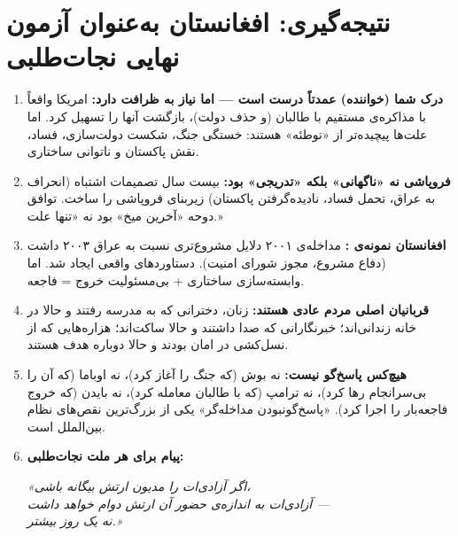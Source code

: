 \section*{نتیجه‌گیری: افغانستان به‌عنوان آزمون نهایی نجات‌طلبی}%

\label{sec:app-afg-conclusion}

\begin{tcolorbox}[wavebox, title={یافته‌های نهایی}]
\begin{enumerate}[nosep, label=\textbf{\arabic*.}]
  \item \textbf{درک شما (خواننده) عمدتاً درست است — اما نیاز به ظرافت دارد:} امریکا واقعاً با مذاکره‌ی مستقیم با طالبان (و حذف دولت)، بازگشت آنها را تسهیل کرد. اما علت‌ها پیچیده‌تر از «توطئه» هستند: خستگی جنگ، شکست دولت‌سازی، فساد، نقش پاکستان و ناتوانی ساختاری.

  \item \textbf{فروپاشی نه «ناگهانی» بلکه «تدریجی» بود:} بیست سال تصمیمات اشتباه (انحراف به عراق، تحمل فساد، نادیده‌گرفتن پاکستان) زیربنای فروپاشی را ساخت. توافق دوحه «آخرین میخ» بود نه «تنها علت.»

  \item \textbf{افغانستان نمونه‌ی :} مداخله‌ی ۲۰۰۱ دلایل مشروع‌تری نسبت به عراق ۲۰۰۳ داشت (دفاع مشروع، مجوز شورای امنیت). دستاوردهای واقعی ایجاد شد. اما وابسته‌سازی ساختاری + بی‌مسئولیت خروج = فاجعه.

  \item \textbf{قربانیان اصلی مردم عادی هستند:} زنان، دخترانی که به مدرسه رفتند و حالا در خانه زندانی‌اند؛ خبرنگارانی که صدا داشتند و حالا ساکت‌اند؛ هزاره‌هایی که از نسل‌کشی در امان بودند و حالا دوباره هدف هستند.

  \item \textbf{هیچ‌کس پاسخ‌گو نیست:} نه بوش (که جنگ را آغاز کرد)، نه اوباما (که آن را بی‌سرانجام رها کرد)، نه ترامپ (که با طالبان معامله کرد)، نه بایدن (که خروج فاجعه‌بار را اجرا کرد). «پاسخ‌گونبودن مداخله‌گر» یکی از بزرگ‌ترین نقص‌های نظام بین‌الملل است.

  \item \textbf{پیام برای هر ملت نجات‌طلبی:}
  \begin{center}
  \textit{«اگر آزادی‌ات را مدیون ارتش بیگانه باشی،\\
  آزادی‌ات به اندازه‌ی حضور آن ارتش دوام خواهد داشت — \\
  نه یک روز بیشتر.»}
  \end{center}
\end{enumerate}
\end{tcolorbox}

\cleardoublepage